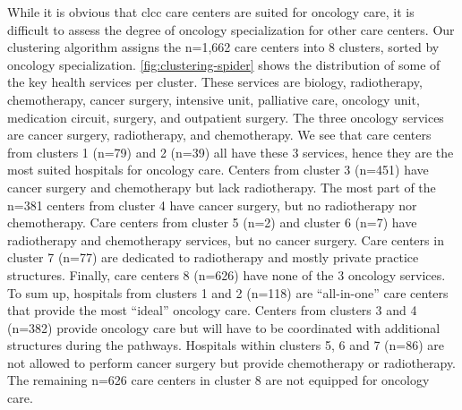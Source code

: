 While it is obvious that \ac{clcc} care centers are suited for oncology care, it is difficult to assess the degree of oncology specialization for other care centers. Our clustering algorithm assigns the n=1,662 care centers into 8 clusters, sorted by oncology specialization. \cref{fig:clustering-spider} shows the distribution of some of the key health services per cluster. These services are biology, radiotherapy, chemotherapy, cancer surgery, intensive unit, palliative care, oncology unit, medication circuit, surgery, and outpatient surgery. The three oncology services are cancer surgery, radiotherapy, and chemotherapy. We see that care centers from clusters 1 (n=79) and 2 (n=39) all have these 3 services, hence they are the most suited hospitals for oncology care. Centers from cluster 3 (n=451) have cancer surgery and chemotherapy but lack radiotherapy. The most part of the n=381 centers from cluster 4 have cancer surgery, but no radiotherapy nor chemotherapy. Care centers from cluster 5 (n=2) and cluster 6 (n=7) have radiotherapy and chemotherapy services, but no cancer surgery. Care centers in cluster 7 (n=77) are dedicated to radiotherapy and mostly private practice structures. Finally, care centers 8 (n=626) have none of the 3 oncology services. To sum up, hospitals from clusters 1 and 2 (n=118) are “all-in-one” care centers that provide the most “ideal” oncology care. Centers from clusters 3 and 4 (n=382) provide oncology care but will have to be coordinated with additional structures during the pathways. Hospitals within clusters 5, 6 and 7 (n=86) are not allowed to perform cancer surgery but provide chemotherapy or radiotherapy. The remaining n=626 care centers in cluster 8 are not equipped for oncology care.

